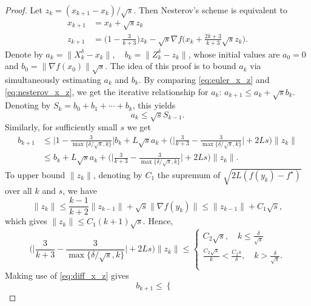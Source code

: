 \documentclass[twoside,11pt]{article}
\begin{document}
\begin{proof}
Let $z_k = (x_{k+1} - x_k)/\sqrt{s}$. Then Nesterov's scheme is equivalent to
\begin{equation}\label{eq:nesterov_x_z}
\begin{aligned}
x_{k+1} &= x_k + \sqrt{s}z_k\\
z_{k+1} & = \Big( 1 - \frac3{k+3} \Big) z_k - \sqrt{s}\nabla f\Big( x_k + \frac{2k+3}{k+3}\sqrt{s}z_k\Big).
\end{aligned}
\end{equation}
Denote by $a_k = \|X_k^{\delta} - x_k\|, \quad b_k = \|Z_k^{\delta} - z_k\|$, whose initial values are $a_0 = 0$ and $b_0 = \|\nabla f(x_0)\|\sqrt{s}$. The idea of this proof is to bound $a_k$ via simultaneously estimating $a_k$ and $b_k$. By comparing \eqref{eq:euler_x_z} and \eqref{eq:nesterov_x_z}, we get the iterative relationship for $a_k$: $a_{k+1} \le a_k + \sqrt{s}b_k$. Denoting by $S_k = b_0 + b_1 + \cdots + b_k$, this yields
\begin{equation}\label{eq:diff_x_z}
a_k \le \sqrt{s}S_{k-1}.
\end{equation}
Similarly, for sufficiently small $s$ we get
\[
\begin{aligned}
b_{k+1} &\le \Big| 1 - \frac{3}{\max\{\delta/\sqrt{s}, k \}} \Big| b_k + L\sqrt{s}a_k + \Big(\Big|\frac3{k+3} - \frac3{\max\{\delta/\sqrt{s}, k\}} \Big| + 2Ls  \Big)\|z_k\|\\
& \le b_k + L\sqrt{s}a_k + \Big(\Big|\frac3{k+3} - \frac3{\max\{\delta/\sqrt{s}, k\}} \Big| + 2Ls  \Big)\|z_k\|.
\end{aligned}
\]
To upper bound $\|z_k\|$, denoting by $C_1$ the supremum of $\sqrt{2L(f(y_k) - f^\star)}$ over all $k$ and $s$, we have
\[
\|z_k\| \le \frac{k - 1}{k + 2}\|z_{k-1}\|  + \sqrt{s}\|\nabla f(y_k)\| \le \|z_{k-1}\|  + C_1\sqrt{s},
\]
which gives $\|z_k\| \le C_1(k + 1)\sqrt{s}$. Hence,
\begin{equation}\nonumber
\Big(\Big|\frac3{k+3} - \frac3{\max\{\delta/\sqrt{s}, k\}} \Big| + 2Ls
\Big)\|z_k\| \le
\begin{cases}
C_2\sqrt{s}, \quad k \le \frac{\delta}{\sqrt{s}}\\
\frac{C_2\sqrt{s}}{k} < \frac{C_2s}{\delta}, \quad k > \frac{\delta}{\sqrt{s}}.\\
\end{cases}
\end{equation}
Making use of \eqref{eq:diff_x_z} gives 
\begin{equation}\label{eq:bk_iterative}
b_{k +1} \le 
\begin{cases}

\end{cases}
\end{equation}
\end{proof}
\end{document}
